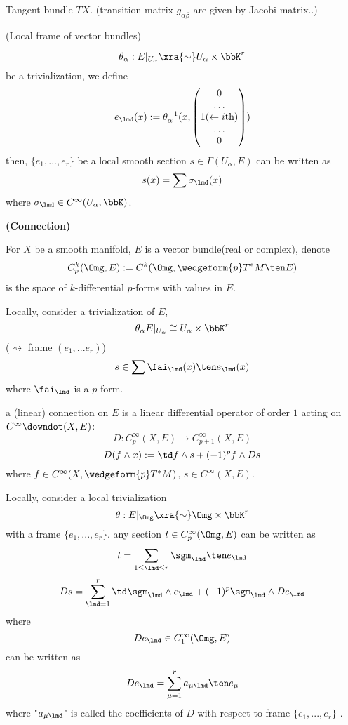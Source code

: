 \begin{example}Tangent bundle $TX$.
(transition matrix $g_{\alpha\beta}$ are given by Jacobi matrix..)
\end{example}

\begin{definition}(Local frame of vector bundles)

$$\theta_{\alpha}:E|_{U_{\alpha}}\xra{\sim} U_{\alpha}\times\bbK^r$$
be a trivialization, we define
$$
  e_{\lmd}(x):=
  \theta_{\alpha}^{-1}
  (x,\begin{pmatrix}
       0\\
       \ldots\\
       1(\leftarrow i\text{th})\\
       \ldots\\
       0
     \end{pmatrix})
$$
then, $\{e_1,...,e_r\}$ be a local smooth section
$s\in\Gamma(U_{\alpha},E)$ can be written as
$$s(x)=\sum\sigma_{\lmd}(x)$$
where $\sigma_{\lmd}\in C^{\infty}(U_\alpha,\bbK)$.
\end{definition}

\textbf{(Connection)}

\begin{notation}

For $X$ be a smooth manifold, $E$ is a vector bundle(real or complex), denote
$$C_p^k(\Omg,E):=C^k(\Omg,\wedgeform{p}T^*M\ten E)$$
is the space of $k$-differential $p$-forms with values in $E$.

Locally, consider a trivialization of $E$,
$$\theta_{\alpha}E|_{U_{\alpha}}\cong U_{\alpha}\times \bbK^{r}$$
($\rightsquigarrow$ frame $(e_1,...e_r)$)
$$s\in \sum\fai_{\lmd}(x)\ten e_{\lmd}(x)$$
where $\fai_{\lmd}$ is a $p$-form.
\end{notation}

\begin{definition}
a (linear) connection on $E$ is a linear differential operator of order $1$ acting on
$C^{\infty}\downdot(X,E)$:
$$D:C_{p}^{\infty}(X,E)\to C_{p+1}^{\infty}(X,E)$$
$$D(f\wedge x):= \td f\wedge s+(-1)^p f\wedge Ds$$
where $f\in C^{\infty}(X,\wedgeform{p}T^*M)$, $s\in C^{\infty}(X,E)$.
\end{definition}

Locally, consider a local trivialization
$$\theta:E|_{\Omg}\xra{\sim}\Omg\times\bbK^r$$
with a frame $\{e_1,...,e_r\}$. any section
$t\in C^{\infty}_p(\Omg,E)$ can be written as
$$t=\sum_{1\leq\lmd\leq r}\sgm_{\lmd}\ten e_{\lmd}$$
$$Ds=\sum_{\lmd=1}^r\td\sgm_{\lmd}\wedge e_{\lmd}+(-1)^p\sgm_{\lmd}\wedge De_{\lmd}$$
where
$$De_{\lmd}\in C_1^{\infty}(\Omg, E)$$
can be written as
$$De_{\lmd}=\sum_{\mu=1}^r
             a_{\mu\lmd}\ten e_{\mu}$$
where "$a_{\mu \lmd}$" is called the coefficients of $D$
 with respect to frame $\{e_1,...,e_r\}$ .

